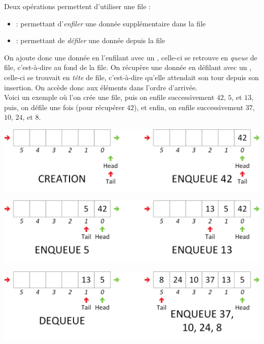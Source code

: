 \smallskip

Deux opérations permettent d'utiliser une file :
\begin{itemize}
\item {} : permettant d'\textit{enfiler} une donnée supplémentaire dans la file
\item {} : permettant de \textit{défiler} une donnée depuis la file
\end{itemize}
On ajoute donc une donnée en l'enfilant avec un , celle-ci se retrouve en \textit{queue} de file, c'est-à-dire au fond de la file.
On récupère une donnée en défilant avec un , celle-ci se trouvait en \textit{tête} de file, c'est-à-dire qu'elle attendait son tour depuis son insertion.
On accède donc aux éléments dans l'ordre d'arrivée.\\

Voici un exemple où l'on crée une file, puis on enfile successivement $ 42 $, $ 5 $, et $ 13 $, puis, on défile une fois (pour récupérer $ 42 $), et enfin, on enfile successivement $ 37 $, $ 10 $, $ 24 $, et $ 8 $.\\

\begin{center}
\includegraphics[scale=0.65]{Cours/Files_2_Structure_Generale_Usage_pack_1.png}
\end{center}

\begin{center}
\includegraphics[scale=0.65]{Cours/Files_2_Structure_Generale_Usage_pack_2.png}
\end{center}

\begin{center}
\includegraphics[scale=0.65]{Cours/Files_2_Structure_Generale_Usage_pack_3.png}
\end{center}


